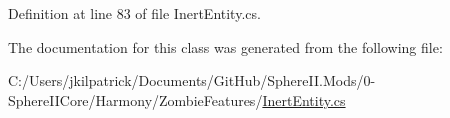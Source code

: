 Definition at line 83 of file Inert\+Entity.\+cs.



The documentation for this class was generated from the following file\+:\begin{DoxyCompactItemize}
\item 
C\+:/\+Users/jkilpatrick/\+Documents/\+Git\+Hub/\+Sphere\+I\+I.\+Mods/0-\/\+Sphere\+I\+I\+Core/\+Harmony/\+Zombie\+Features/\mbox{\hyperlink{_inert_entity_8cs}{Inert\+Entity.\+cs}}\end{DoxyCompactItemize}
